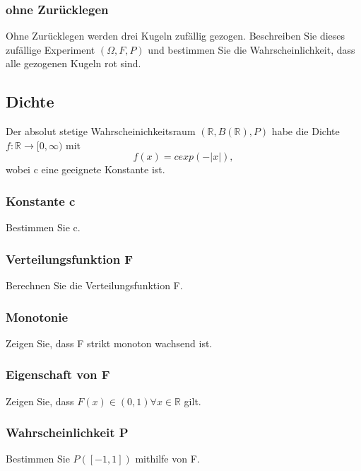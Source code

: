 \documentclass[paper=a4, fontsize=11pt]{scrartcl}
\numberwithin{equation}{section}
\numberwithin{figure}{section}
\numberwithin{table}{section}
\begin{document}
\subsubsection{ohne Zurücklegen}
Ohne Zurücklegen werden drei Kugeln zufällig gezogen. Beschreiben Sie dieses zufällige Experiment $(\Omega,F,P)$ und bestimmen Sie die Wahrscheinlichkeit, dass alle gezogenen Kugeln rot sind. \\

\subsection{Dichte}
Der absolut stetige Wahrscheinichkeitsraum $(\mathbb{R},B(\mathbb{R}),P)$ habe die Dichte $f:\mathbb{R} \rightarrow [0, \infty)$ mit 
$$f(x)=cexp(-|x|),$$
wobei c eine geeignete Konstante ist. \\

\subsubsection{Konstante c}
Bestimmen Sie c. \\

\subsubsection{Verteilungsfunktion F}
Berechnen Sie die Verteilungsfunktion F. \\

\subsubsection{Monotonie}
Zeigen Sie, dass F strikt monoton wachsend ist. \\

\subsubsection{Eigenschaft von F}
Zeigen Sie, dass $F(x) \in (0,1) \forall x \in \mathbb{R}$ gilt. \\

\subsubsection{Wahrscheinlichkeit P}
Bestimmen Sie $P([-1,1])$ mithilfe von F. \\

\end{document}
